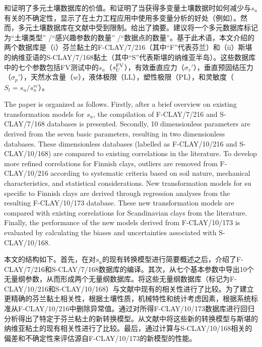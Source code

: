 \begin{paracol}{2}
    \switchcolumn

    \citet{Ching201252,Ching2012522, Ching2013907,Ching2014663,Ching2014686}和\citet{Ching201477}证明了多元土壤数据库的价值。\citet{Müller2014231,Müller2016603}和\citet{Prästings20161}证明了当获得多变量土壤数据时如何减少与$s_u$有关的不确定性，显示了在土力工程应用中使用多变量分析的好处（例如\citealt{Ching201016}）。然而，多元土壤数据库在文献中受到限制。给出了摘要。\citet{Ching2014663}建议将一个多元数据库标记为“土壤类型” /“感兴趣参数的数量” /“数据点的数量”。基于此术语，本文介绍的两个数据库是（i）芬兰黏土的F-CLAY/7/216（其中“F”代表芬兰）和（ii）斯堪的纳维亚语的S-CLAY/7/168黏土（其中“S”代表斯堪的纳维亚半岛）。这些数据库中的七个参数包括FV测试中的$s_u$（$s_U^{\rm{FV}}$），有效垂直应力（$\sigma_v'$），垂直预固结压力（$\sigma_p'$），天然水含量（$w$），液体极限（LL），塑性极限（PL），和灵敏度（$S_t=s_u/s_u^{re}$）。

    
    \switchcolumn*

    The paper is organized as follows. Firstly, after a brief overview on existing transformation models for $s_u$, the compilation of F-CLAY/7/216 and S-CLAY/7/168 databases is presented. Secondly, 10 dimensionless parameters are derived from the seven basic parameters, resulting in two dimensionless databases. These dimensionless databases (labelled as F-CLAY/10/216 and S-CLAY/10/168) are compared to existing correlations in the literature. To develop more reﬁned correlations for Finnish clays, outliers are removed from F-CLAY/10/216 according to systematic criteria based on soil nature, mechanical characteristics, and statistical considerations. New transformation models for su speciﬁc to Finnish clays are derived through regression analyses from the resulting F-CLAY/10/173 database. These new transformation models are compared with existing correlations for Scandinavian clays from the literature. Finally, the performance of the new models derived from F-CLAY/10/173 is evaluated by calculating the biases and uncertainties associated with S-CLAY/10/168.

    \switchcolumn

    本文的结构如下。首先，在对$s_u$的现有转换模型进行简要概述之后，介绍了F-CLAY/7/216和S-CLAY/7/168数据库的编译。其次，从七个基本参数中导出10个无量纲参数，从而形成两个无量纲数据库。将这些无量纲数据库（标记为F-CLAY/10/216和S-CLAY/10/168）与文献中现有的相关性进行了比较。为了建立更精确的芬兰黏土相关性，根据土壤性质，机械特性和统计考虑因素，根据系统标准从F-CLAY/10/216中删除异常值。通过对所得F-CLAY/10/173数据库进行回归分析得出了特定于芬兰粘土的新转换模型。从文献中将这些新的转换模型与斯堪的纳维亚粘土的现有相关性进行了比较。最后，通过计算与S-CLAY/10/168相关的偏差和不确定性来评估源自F-CLAY/10/173的新模型的性能。

\end{paracol}